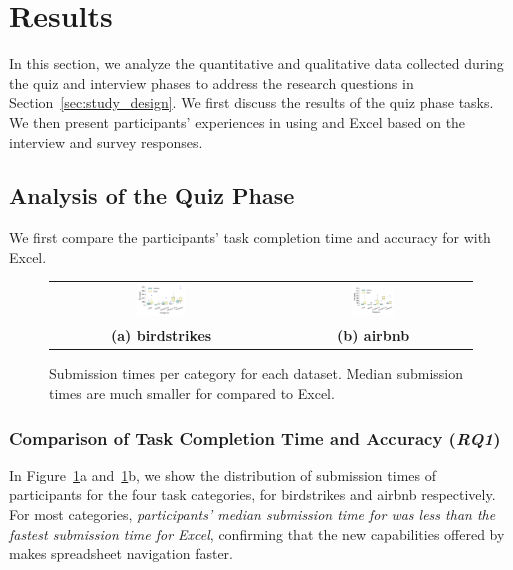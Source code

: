 \section{Results}
\label{sec:results}
In this section, we analyze the quantitative and 
qualitative data collected during the quiz and interview phases 
to address the research questions in Section~\ref{sec:study_design}. 
We first discuss the results of the quiz phase tasks. 
We then present participants’ experiences in using \noah and Excel 
based on the interview and survey responses.

\subsection{Analysis of the Quiz Phase}
We first compare the participants’ task completion time 
and accuracy for \noah with Excel.  
\begin{figure}[t]
   \centering
\begin{tabular}{c c}  %
 \includegraphics[width=0.23\textwidth,trim={18 20 20 15},clip]{images/bird_box.pdf} &
   \includegraphics[width=0.23\textwidth,trim={18 20 20 15},clip]{images/airbnb_box.pdf} \\
   \textbf{(a) birdstrikes} & \textbf{(b) airbnb} \\
\end{tabular}
\vspace{-13pt}
\caption{Submission times per category for each dataset. Median submission times are much smaller for \noah compared to Excel.}
\vspace{-20pt} 
\label{fig:timeBox}
\end{figure}

\subsubsection{Comparison of Task Completion Time and Accuracy (\emph{RQ1})}
In Figure~\ref{fig:timeBox}a and~\ref{fig:timeBox}b, 
we show the distribution of submission times of participants 
for the four task categories, for birdstrikes and airbnb respectively. 
For most categories, 
\emph{participants’ median submission time for \noah 
was less than the fastest submission time for Excel},
confirming that the new capabilities offered by \noah
makes spreadsheet navigation faster. 

